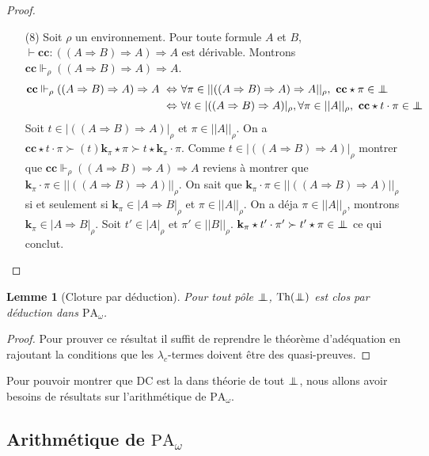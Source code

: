\documentclass[a4paper,12pt]{article}
\newtheorem{lem}[theo]{Lemme}
\theoremstyle{rmqstyle}
\newcommand{\abs}[1]{\lvert#1\rvert}
\newcommand{\abss}[1]{\lvert \lvert#1\rvert \rvert}
\newcommand{\PA}{\mathrm{PA}}
\renewcommand{\implies}{\Rightarrow}
\renewcommand{\iff}{\Leftrightarrow}
\newcommand{\cc}{\mathbf{cc}}
\renewcommand{\k}{\mathbf{k}}
\newcommand{\pole}{{\protect\mathpalette{\protect\polehelper}{\bot}}} \def\polehelper#1#2{\mathrel{\rlap{$#1#2$}\mkern3mu{#1#2}}}
\newcommand{\Th}{\mathrm{Th}}
\newcommand{\DC}{\mathrm{DC}}
\begin{document}
\begin{proof}
\begin{itemize}
\item[(8)] Soit $\rho$ un environnement. Pour toute formule $A$ et $B$, $\vdash \cc : ((A \implies B) \implies A) \implies A$ est dérivable. Montrons $\cc \Vdash_\rho ((A \implies B) \implies A) \implies A$.
\begin{align*}
\cc \Vdash_\rho ((A \implies B) \implies A) \implies A \ \iff& \ \forall \pi \in \abss{((A \implies B) \implies A) \implies A}_\rho, \ \cc \star \pi \in \pole\\
\iff& \ \forall t \in \abs{((A \implies B) \implies A)}_\rho, \forall \pi \in \abss{A}_\rho, \ \cc \star t \cdot \pi \in \pole
\end{align*}
Soit $t \in \abs{((A \implies B) \implies A)}_\rho$ et $\pi \in \abss{A}_\rho$. On a $ \cc \star t \cdot \pi \succ (t)\k_\pi \star \pi \succ t \star \k_\pi \cdot \pi$. Comme $t \in \abs{((A \implies B) \implies A)}_\rho$ montrer que $\cc \Vdash_\rho ((A \implies B) \implies A) \implies A$ reviens à montrer que $\k_\pi \cdot \pi \in \abss{((A \implies B) \implies A)}_\rho$. On sait que $\k_\pi \cdot \pi \in \abss{((A \implies B) \implies A)}_\rho$ si et seulement si $\k_\pi \in \abs{A \implies B}_\rho$ et $\pi \in \abss{A}_\rho$. On a déja $\pi \in \abss{A}_\rho$, montrons $\k_\pi \in \abs{A \implies B}_\rho$. Soit $t' \in \abs{A}_\rho$ et $\pi' \in \abss{B}_\rho$. $\k_\pi \star t' \cdot \pi' \succ t' \star \pi \in \pole$ ce qui conclut. 
\end{itemize}
\end{proof}

\begin{lem}[Cloture par déduction]
\label{cloture}
Pour tout pôle $\pole$, $\Th(\pole)$ est clos par déduction dans $\PA_\omega$.
\end{lem}

\begin{proof}
Pour prouver ce résultat il suffit de reprendre le théorème d'adéquation en rajoutant la conditions que les $\lambda_c$-termes doivent être des quasi-preuves. 
\end{proof}

Pour pouvoir montrer que $\DC$ est la dans théorie de tout $\pole$, nous allons avoir besoins de résultats sur l'arithmétique de $\PA_\omega$.

\clearpage
\subsection{Arithmétique de \( \PA_\omega \)}
\label{arithmetique de PA}
\end{document}
